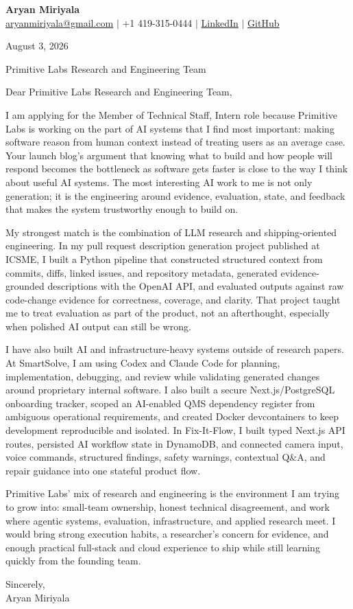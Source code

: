 \documentclass[letterpaper,11pt]{article}
\begin{document}
{\Large\textbf{Aryan Miriyala}}\\
\href{mailto:aryanmiriyala@gmail.com}{aryanmiriyala@gmail.com} $|$ +1 419-315-0444 $|$
\href{https://www.linkedin.com/in/aryan-miriyala-7788a21b6/}{LinkedIn} $|$
\href{https://github.com/aryanmiriyala}{GitHub}

August 3, 2026

Primitive Labs Research and Engineering Team

Dear Primitive Labs Research and Engineering Team,

I am applying for the Member of Technical Staff, Intern role because Primitive Labs is working on the part of AI systems that I find most important: making software reason from human context instead of treating users as an average case. Your launch blog's argument that knowing what to build and how people will respond becomes the bottleneck as software gets faster is close to the way I think about useful AI systems. The most interesting AI work to me is not only generation; it is the engineering around evidence, evaluation, state, and feedback that makes the system trustworthy enough to build on.

My strongest match is the combination of LLM research and shipping-oriented engineering. In my pull request description generation project published at ICSME, I built a Python pipeline that constructed structured context from commits, diffs, linked issues, and repository metadata, generated evidence-grounded descriptions with the OpenAI API, and evaluated outputs against raw code-change evidence for correctness, coverage, and clarity. That project taught me to treat evaluation as part of the product, not an afterthought, especially when polished AI output can still be wrong.

I have also built AI and infrastructure-heavy systems outside of research papers. At SmartSolve, I am using Codex and Claude Code for planning, implementation, debugging, and review while validating generated changes around proprietary internal software. I also built a secure Next.js/PostgreSQL onboarding tracker, scoped an AI-enabled QMS dependency register from ambiguous operational requirements, and created Docker devcontainers to keep development reproducible and isolated. In Fix-It-Flow, I built typed Next.js API routes, persisted AI workflow state in DynamoDB, and connected camera input, voice commands, structured findings, safety warnings, contextual Q\&A, and repair guidance into one stateful product flow.

Primitive Labs' mix of research and engineering is the environment I am trying to grow into: small-team ownership, honest technical disagreement, and work where agentic systems, evaluation, infrastructure, and applied research meet. I would bring strong execution habits, a researcher's concern for evidence, and enough practical full-stack and cloud experience to ship while still learning quickly from the founding team.

Sincerely,\\
Aryan Miriyala
\end{document}
